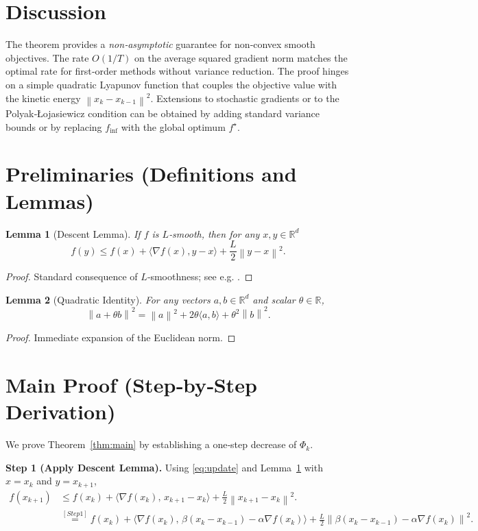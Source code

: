 \documentclass{article}
\newtheorem{lemma}{Lemma}
\newcommand{\norm}[1]{\left\lVert#1\right\rVert}
\begin{document}
\section*{Discussion}
The theorem provides a \emph{non‑asymptotic} guarantee for non‑convex smooth objectives. The rate $O(1/T)$ on the average squared gradient norm matches the optimal rate for first‑order methods without variance reduction. The proof hinges on a simple quadratic Lyapunov function that couples the objective value with the kinetic energy $\norm{x_{k}-x_{k-1}}^{2}$. Extensions to stochastic gradients or to the Polyak‑Łojasiewicz condition can be obtained by adding standard variance bounds or by replacing $f_{\inf}$ with the global optimum $f^{\star}$.

\newpage
\section*{Preliminaries (Definitions and Lemmas)}
\begin{lemma}[Descent Lemma]\label{lem:descent}
If $f$ is $L$‑smooth, then for any $x,y\in\mathbb{R}^{d}$
\[
f(y)\le f(x)+\langle\nabla f(x),y-x\rangle+\frac{L}{2}\norm{y-x}^{2}.
\tag{2}
\]
\end{lemma}
\begin{proof}
Standard consequence of $L$‑smoothness; see e.g. \cite{Nesterov2004}.
\end{proof}

\begin{lemma}[Quadratic Identity]\label{lem:quad}
For any vectors $a,b\in\mathbb{R}^{d}$ and scalar $\theta\in\mathbb{R}$,
\[
\norm{a+\theta b}^{2}= \norm{a}^{2}+2\theta\langle a,b\rangle+\theta^{2}\norm{b}^{2}.
\tag{3}
\]
\end{lemma}
\begin{proof}
Immediate expansion of the Euclidean norm.
\end{proof}

\section*{Main Proof (Step‑by‑Step Derivation)}
We prove Theorem~\ref{thm:main} by establishing a one‑step decrease of $\Phi_{k}$.

\noindent\textbf{Step 1 (Apply Descent Lemma).}  
Using \eqref{eq:update} and Lemma~\ref{lem:descent} with $x=x_{k}$ and $y=x_{k+1}$,
\begin{align}
f(x_{k+1})
&\le f(x_{k})+\bigl\langle\nabla f(x_{k}),\,x_{k+1}-x_{k}\bigr\rangle
   +\frac{L}{2}\norm{x_{k+1}-x_{k}}^{2}. \nonumber\\
&\overset{[Step 1]}{=} f(x_{k})+\bigl\langle\nabla f(x_{k}),\,\beta(x_{k}-x_{k-1})-\alpha\nabla f(x_{k})\bigr\rangle
   +\frac{L}{2}\norm{\beta(x_{k}-x_{k-1})-\alpha\nabla f(x_{k})}^{2}. \tag{4}
\end{align}
\end{document}
